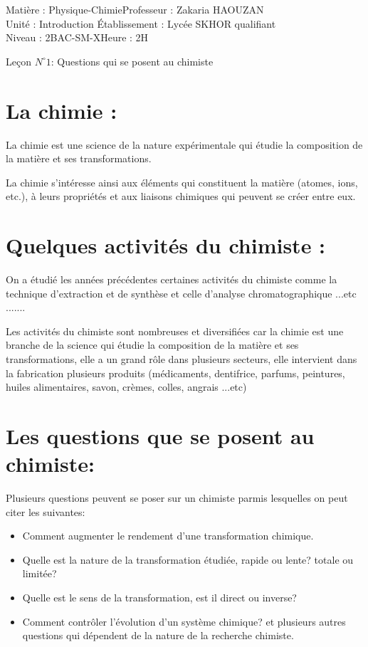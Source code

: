 \documentclass[12pt]{article}
\author{Zakaria HAOUZAN}
\date{\today}
\newcommand\headerMe[2]{\noindent{}#1\hfill#2}
\begin{document}
\headerMe{Matière : Physique-Chimie}{Professeur : Zakaria HAOUZAN}\\
\headerMe{Unité : Introduction }{Établissement : Lycée SKHOR qualifiant}\\
\headerMe{Niveau : 2BAC-SM-X}{Heure : 2H}\\

\begin{center}

    \Large{Leçon $N^{\circ} 1 $: \color{red}  Questions qui se posent au chimiste }
\end{center}

\section{La chimie :  }
La chimie est une science de la nature expérimentale qui étudie la composition de la matière et ses transformations.

La chimie s'intéresse ainsi aux éléments qui constituent la matière (atomes, ions, etc.), à leurs propriétés et aux liaisons chimiques qui peuvent se créer entre eux.


\section{ Quelques activités du chimiste : }
On a étudié les années précédentes certaines activités du chimiste comme la technique d'extraction et de synthèse et celle
d'analyse chromatographique ...etc .......

Les activités du chimiste sont nombreuses et diversifiées car la chimie est une branche de la science qui étudie la
composition de la matière et ses transformations, elle a un grand rôle dans plusieurs secteurs, elle intervient dans la
fabrication plusieurs produits (médicaments, dentifrice, parfums, peintures, huiles alimentaires, savon, crèmes, colles,
angrais ...etc)

\section{Les questions que se posent au chimiste: }
Plusieurs questions peuvent se poser sur un chimiste parmis lesquelles on peut citer les suivantes: 

\begin{itemize}
	\item Comment augmenter le rendement d'une transformation chimique.
	\item  Quelle est la nature de la transformation étudiée, rapide ou lente? totale ou limitée?
	\item  Quelle est le sens de la transformation, est il direct ou inverse?
	\item Comment contrôler l'évolution d'un système chimique? et plusieurs autres questions qui dépendent de la nature de la recherche chimiste.

\end{itemize}
\end{document}
